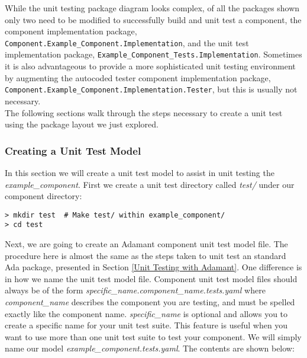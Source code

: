 While the unit testing package diagram looks complex, of all the packages shown only two need to be modified to successfully build and unit test a component, the component implementation package, \texttt{Component.Example\_Component.Implementation}, and the unit test implementation package, \texttt{Example\_Component\_Tests.Implementation}. Sometimes it is also advantageous to provide a more sophisticated unit testing environment by augmenting the autocoded tester component implementation package, \texttt{Component.Example\_Component.Implementation.Tester}, but this is usually not necessary. \\

The following sections walk through the steps necessary to create a unit test using the package layout we just explored.

\subsubsection{Creating a Unit Test Model} \label{Creating a Unit Test Model}

In this section we will create a unit test model to assist in unit testing the \textit{example\_component}. First we create a unit test directory called \textit{test/} under our component directory:

\vspace{5mm} %
\begin{verbatim}
> mkdir test  # Make test/ within example_component/
> cd test
\end{verbatim}
\vspace{5mm} %

Next, we are going to create an Adamant component unit test model file. The procedure here is almost the same as the steps taken to unit test an standard Ada package, presented in Section \ref{Unit Testing with Adamant}. One difference is in how we name the unit test model file. Component unit test model files should always be of the form \textit{specific\_name.component\_name.tests.yaml} where \textit{component\_name} describes the component you are testing, and must be spelled exactly like the component name. \textit{specific\_name} is optional and allows you to create a specific name for your unit test suite. This feature is useful when you want to use more than one unit test suite to test your component. We will simply name our model \textit{example\_component.tests.yaml}. The contents are shown below:


